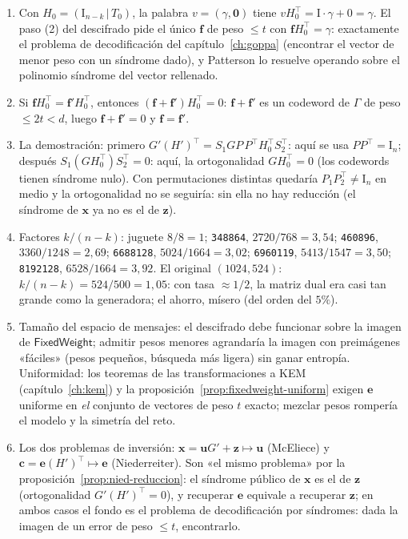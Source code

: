 \documentclass[11pt,a4paper,oneside]{report}
\newcommand{\ve}{\mathbf{e}}
\newcommand{\vx}{\mathbf{x}}
\newcommand{\vc}{\mathbf{c}}
\newcommand{\vu}{\mathbf{u}}
\newcommand{\vz}{\mathbf{z}}
\newcommand{\vf}{\mathbf{f}}
\begin{document}
\begin{enumerate}[leftmargin=1.9em,itemsep=4pt]
  \item Con $H_0=(\mathrm{I}_{n-k}\,|\,T_0)$, la palabra
        $v=(\gamma,\mathbf{0})$ tiene
        $vH_0^{\top}=\mathrm{I}\cdot\gamma+0=\gamma$. El paso (2) del
        descifrado pide el único $\vf$ de peso $\le t$ con
        $\vf H_0^{\top}=\gamma$: exactamente el problema de
        decodificación del capítulo~\ref{ch:goppa} (encontrar el
        vector de menor peso con un síndrome dado), y Patterson lo
        resuelve operando sobre el polinomio síndrome del vector
        rellenado.
  \item Si $\vf H_0^{\top}=\vf'H_0^{\top}$, entonces
        $(\vf+\vf')H_0^{\top}=0$: $\vf+\vf'$ es un codeword de
        $\Gamma$ de peso $\le2t<d$, luego $\vf+\vf'=0$ y
        $\vf=\vf'$.
  \item La demostración: primero $G'(H')^{\top}
        =S_1GP\,P^{\top}H_0^{\top}S_2^{\top}$: aquí se usa
        $PP^{\top}=\mathrm{I}_n$; después
        $S_1(GH_0^{\top})S_2^{\top}=0$: aquí, la ortogonalidad
        $GH_0^{\top}=0$ (los codewords tienen síndrome nulo).
        Con permutaciones distintas quedaría $P_1P_2^{\top}\ne
        \mathrm{I}_n$ en medio y la ortogonalidad no se seguiría:
        sin ella no hay reducción (el síndrome de $\vx$ ya no es el
        de $\vz$).
  \item Factores $k/(n-k)$: juguete $8/8=1$;
        \texttt{348864}, $2720/768=3{,}54$;
        \texttt{460896}, $3360/1248=2{,}69$;
        \texttt{6688128}, $5024/1664=3{,}02$;
        \texttt{6960119}, $5413/1547=3{,}50$;
        \texttt{8192128}, $6528/1664=3{,}92$.
        El original $(1024,524)$: $k/(n-k)=524/500=1{,}05$: con tasa
        $\approx1/2$, la matriz dual era casi tan grande como la
        generadora; el ahorro, mísero (del orden del $5\%$).
  \item Tamaño del espacio de mensajes: el descifrado debe
        funcionar sobre la imagen de
        $\textsf{FixedWeight}$; admitir pesos menores agrandaría la
        imagen con preimágenes «fáciles» (pesos pequeños, búsqueda
        más ligera) sin ganar entropía. Uniformidad: los teoremas de
        las transformaciones a KEM (capítulo~\ref{ch:kem}) y la
        proposición~\ref{prop:fixedweight-uniform} exigen $\ve$
        uniforme en \emph{el} conjunto de vectores de peso $t$
        exacto; mezclar pesos rompería el modelo y la simetría del
        reto.
  \item Los dos problemas de inversión:
        $\vx=\vu G'+\vz\mapsto\vu$ (McEliece) y
        $\vc=\ve(H')^{\top}\mapsto\ve$ (Niederreiter). Son «el mismo
        problema» por la proposición~\ref{prop:nied-reduccion}: el
        síndrome público de $\vx$ es el de $\vz$ (ortogonalidad
        $G'(H')^{\top}=0$), y recuperar $\ve$ equivale a recuperar
        $\vz$; en ambos casos el fondo es el problema
        de decodificación por síndromes: dada la imagen de un error
        de peso $\le t$, encontrarlo.
\end{enumerate}
\end{document}
